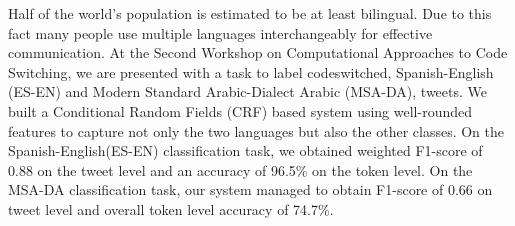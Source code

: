 Half of the world's population is estimated to be at least bilingual. Due to this fact many people use multiple languages interchangeably for effective communication. At the Second Workshop on Computational Approaches to Code Switching, we are presented with a task to label codeswitched, Spanish-English (ES-EN) and Modern Standard Arabic-Dialect Arabic (MSA-DA), tweets. We built a Conditional Random Fields (CRF) based system using well-rounded features to capture not only the two languages but also the other classes. On the Spanish-English(ES-EN) classification task, we obtained weighted F1-score of 0.88 on the tweet level and an accuracy of 96.5\% on the token level. On the MSA-DA classification task, our system managed to obtain F1-score of 0.66 on tweet level and overall token level accuracy of 74.7\%.
